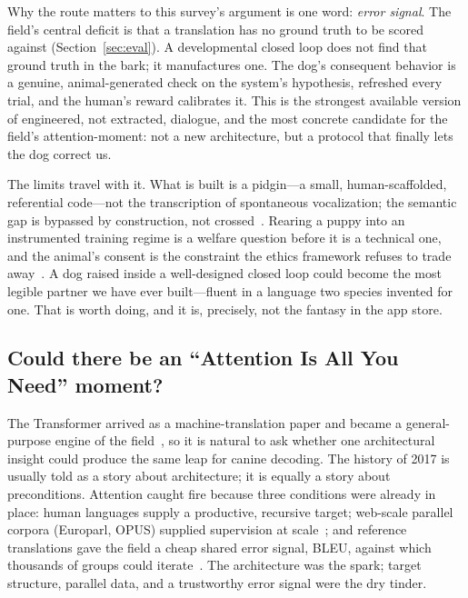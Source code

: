 Why the route matters to this survey's argument is one word: \emph{error
signal}. The field's central deficit is that a translation has no ground
truth to be scored against (Section~\ref{sec:eval}). A developmental closed
loop does not find that ground truth in the bark; it manufactures one. The
dog's consequent behavior is a genuine, animal-generated check on the
system's hypothesis, refreshed every trial, and the human's reward
calibrates it. This is the strongest available version of engineered, not
extracted, dialogue, and the most concrete candidate for the field's
attention-moment: not a new architecture, but a protocol that finally lets
the dog correct us.

The limits travel with it. What is built is a pidgin---a small,
human-scaffolded, referential code---not the transcription of spontaneous
vocalization; the semantic gap is bypassed by construction, not
crossed~\cite{hauser2002faculty,chomsky1957syntactic}. Rearing a puppy into
an instrumented training regime is a welfare question before it is a
technical one, and the animal's consent is the constraint the ethics
framework refuses to trade away~\cite{mancini2011aci,birch2024edge}. A dog
raised inside a well-designed closed loop could become the most legible
partner we have ever built---fluent in a language two species invented for
one. That is worth doing, and it is, precisely, not the fantasy in the app
store.

\subsection{Could there be an ``Attention Is All You Need'' moment?}
The Transformer arrived as a machine-translation paper and became a
general-purpose engine of the field~\cite{vaswani2017attention}, so it is
natural to ask whether one architectural insight could produce the same
leap for canine decoding. The history of 2017 is usually told as a story
about architecture; it is equally a story about preconditions. Attention
caught fire because three conditions were already in place: human languages
supply a productive, recursive target; web-scale parallel corpora
(Europarl, OPUS) supplied supervision at
scale~\cite{koehn2004europarl,tiedemann2012opus}; and reference translations
gave the field a cheap shared error signal, BLEU, against which thousands of
groups could iterate~\cite{papineni2002bleu}. The architecture was the
spark; target structure, parallel data, and a trustworthy error signal were
the dry tinder.

